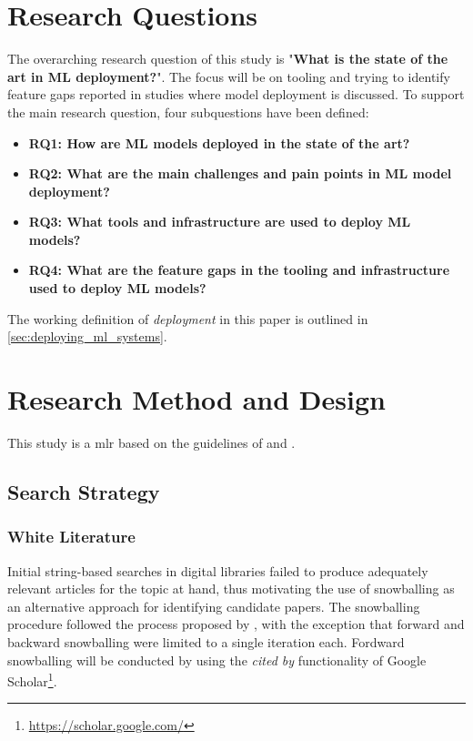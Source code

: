 \section{Research Questions}
\label{sec:research_questions}
The overarching research question of this study is "\textbf{What is the state of the art in ML deployment?}".
The focus will be on tooling and trying to identify feature gaps reported in studies where model deployment is discussed.
To support the main research question, four subquestions have been defined:
\begin{itemize}
    \item \textbf{RQ1: How are ML models deployed in the state of the art?}
    \item \textbf{RQ2: What are the main challenges and pain points in ML model deployment?}
    \item \textbf{RQ3: What tools and infrastructure are used to deploy ML models?}
    \item \textbf{RQ4: What are the feature gaps in the tooling and infrastructure used to deploy ML models?}
\end{itemize}
The working definition of \emph{deployment} in this paper is outlined in \cref{sec:deploying_ml_systems}.

\section{Research Method and Design}
\label{sec:research_method}
This study is a \acrfull{mlr} based on the guidelines of \textcite{Kitchenham07guidelinesfor} and \textcite{Garousi2019}.

\subsection{Search Strategy}
\subsubsection{White Literature}
Initial string-based searches in digital libraries failed to produce adequately relevant articles for the topic at hand, thus motivating the use of snowballing as an alternative approach for identifying candidate papers.
The snowballing procedure followed the process proposed by \textcite{Wohlin2014}, with the exception that forward and backward snowballing were limited to a single iteration each.
Fordward snowballing will be conducted by using the \emph{cited by} functionality of Google Scholar\footnote{\url{https://scholar.google.com/}}.

